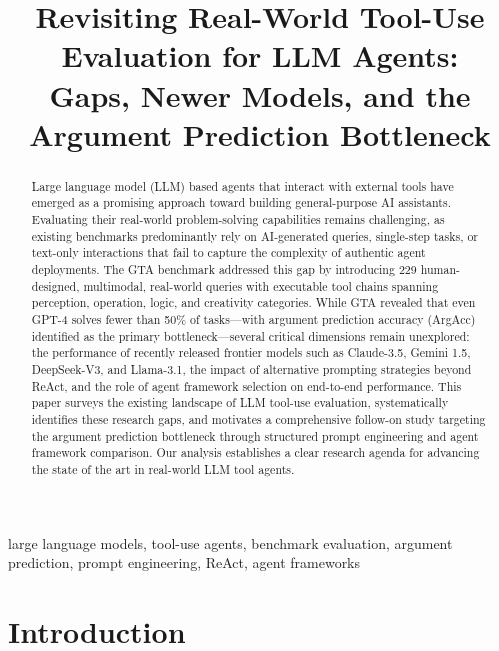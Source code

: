 \documentclass[conference]{IEEEtran}
\begin{document}
\title{Revisiting Real-World Tool-Use Evaluation for LLM Agents:\\
Gaps, Newer Models, and the Argument Prediction Bottleneck}

\author{
    \and
}

\maketitle

\begin{abstract}
Large language model (LLM) based agents that interact with external tools have emerged as a promising approach toward building general-purpose AI assistants. Evaluating their real-world problem-solving capabilities remains challenging, as existing benchmarks predominantly rely on AI-generated queries, single-step tasks, or text-only interactions that fail to capture the complexity of authentic agent deployments. The GTA benchmark addressed this gap by introducing 229 human-designed, multimodal, real-world queries with executable tool chains spanning perception, operation, logic, and creativity categories. While GTA revealed that even GPT-4 solves fewer than 50\% of tasks---with argument prediction accuracy (ArgAcc) identified as the primary bottleneck---several critical dimensions remain unexplored: the performance of recently released frontier models such as Claude-3.5, Gemini 1.5, DeepSeek-V3, and Llama-3.1, the impact of alternative prompting strategies beyond ReAct, and the role of agent framework selection on end-to-end performance. This paper surveys the existing landscape of LLM tool-use evaluation, systematically identifies these research gaps, and motivates a comprehensive follow-on study targeting the argument prediction bottleneck through structured prompt engineering and agent framework comparison. Our analysis establishes a clear research agenda for advancing the state of the art in real-world LLM tool agents.
\end{abstract}

\begin{IEEEkeywords}
large language models, tool-use agents, benchmark evaluation, argument prediction, prompt engineering, ReAct, agent frameworks
\end{IEEEkeywords}

\section{Introduction}
\end{document}
